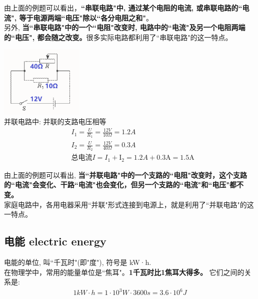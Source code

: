 \documentclass[UTF8]{ctexart}
\begin{document}
	由上面的例题可以看出，\textbf{``串联电路"中, 通过某个电阻的电流, 或串联电路的``电流", 等于电源两端``电压"除以``各分电阻之和"}。 \\
	另外, \textbf{当``串联电路"中的一个``电阻"改变时, 电路中的``电流"及另一个电阻两端的``电压", 都会随之改变。}很多实际电路都利用了``串联电路"的这一特点。\\
	
	
	
	\begin{tcolorbox}[title = {例},boxrule={0.1em},colframe={black!10}, colback={black!3},colbacktitle={black!10},coltitle={black}]		
		\includegraphics[width=0.3\textwidth]{img/0058.png} \\	
	并联电路中: 并联的支路电压相等
	\begin{align}
			& I_1=\frac{U}{R_1}=\frac{12V}{10\varOmega}=1.2A\\
		& I_2=\frac{U}{R_2}=\frac{12V}{40\varOmega}=0.3A\\
		& \text{总电流}I=I_1+\text{I}_2=1.2A+0.3\text{A}=1.5\text{A}		
	\end{align}	
	\end{tcolorbox}
	
	由上面的例题可以看出, \textbf{当``并联电路"中的一个支路的``电阻"改变时，这个支路的``电流"会变化、干路``电流"也会变化，但另一个支路的``电流"和``电压"都不变。} \\
	家庭电路中，各用电器采用``并联"形式连接到电源上，就是利用了``并联电路"的这一特点。\\
	
\vspace{1em} 


\subsection{电能 electric energy}

电能的单位, 叫``千瓦时"(即"度"), 符号是 kW·h.  \\
在物理学中，常用的能量单位是``焦耳"。\textbf{1千瓦时比1焦耳大得多。} 它们之间的关系是: 
\begin{align}
	\boxed{
	1 kW·h = 1 \cdot 10^3 W \cdot 3600s = 3.6 \cdot 10^6 J	
	}
\end{align}
\end{document}

